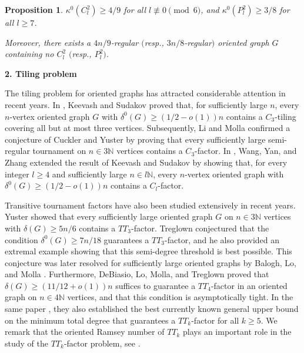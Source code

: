 \documentclass[11pt,a4paper,reqno]{amsart}
\newtheorem{proposition}[theorem]{Proposition}
\theoremstyle{definition} %
\begin{document}
\begin{proposition}\label{Prop:Cl2-lowerbound}
$\kappa^0(C_l^2)\geqslant4/9$ for all $l\not\equiv 0 \pmod 6$, and $\kappa^0(P_l^2)\geqslant3/8$ for all $l\geqslant 7$.

Moreover, there exists a $4n/9$-regular $($resp., $3n/8$-regular$)$ oriented graph $G$ containing no $C_l^2$ $($resp., $P_l^2$$)$.
\end{proposition}



\medskip
\noindent\textbf{2. Tiling problem} 
\medskip

The tiling problem for oriented graphs has attracted considerable attention in recent years. In \cite{keevashJCTB99}, Keevash and Sudakov proved that, for sufficiently large $n$, every $n$-vertex oriented graph $G$ with $\delta^{0}(G)\geqslant (1/2-o(1))n$ contains a $C_3$-tiling covering all but at most three vertices. Subsequently, Li and Molla \cite{liEJC26} confirmed a conjecture of Cuckler \cite{cuckler2008} and Yuster \cite{yusterCSR1} by proving that every sufficiently large semi-regular tournament on $n\in 3\mathbb{N}$ vertices contains a $C_3$-factor. In \cite{wangJGT106}, Wang, Yan, and Zhang extended the result of Keevash and Sudakov \cite{keevashJCTB99} by showing that, for every integer $l\geqslant 4$ and sufficiently large $n\in l\mathbb{N}$, every $n$-vertex oriented graph with $\delta^{0}(G)\geqslant (1/2-o(1))n$ contains a $C_l$-factor.

Transitive tournament factors have also been studied extensively in recent years. Yuster \cite{yusterorder20} showed that every sufficiently large oriented graph $G$ on $n\in 3\mathbb{N}$ vertices with $\delta(G)\geqslant 5n/6$ contains a $TT_3$-factor. Treglown \cite{treglownJGT69} conjectured that the condition $\delta^0(G)\geqslant 7n/18$ guarantees a $TT_3$-factor, and he also provided an extremal example showing that this semi-degree threshold is best possible. This conjecture was later resolved for sufficiently large oriented graphs by Balogh, Lo, and Molla \cite{baloghJCTB124}. Furthermore, DeBiasio, Lo, Molla, and Treglown \cite{debiasioSJDM35} proved that $\delta(G)\geqslant (11/12+o(1))n$ suffices to guarantee a $TT_4$-factor in an oriented graph on $n\in 4\mathbb{N}$ vertices, and that this condition is asymptotically tight. In the same paper \cite{debiasioSJDM35}, they also established the best currently known general upper bound on the minimum total degree that guarantees a $TT_k$-factor for all $k\geqslant 5$. We remark that the oriented Ramsey number of $TT_k$ plays an important role in the study of the $TT_k$-factor problem, see \cite{debiasioSJDM35}.
\end{document}
